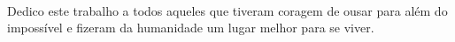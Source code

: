 
\begin{dedicatoria}
\ \\
\ \\
\ \\
\ \\
\ \\
\ \\
\ \\
\ \\
\ \\
\ \\
\ \\
\ \\
\ \\
\ \\
\ \\
\ \\
\ \\
\ \\
\ \\
\ \\
\ \\
\ \\
\ \\
\ \\
\ \\
\ \\
\ \\
\ \\
\ \\
\ \\
\ \\
\ \\
\ \\
\ \\
\ \\
\begin{flushright}
Dedico este trabalho a todos aqueles que tiveram coragem de ousar para al\'em do imposs\'ivel e fizeram da humanidade um lugar melhor para se viver.
\end{flushright}
\end{dedicatoria}
